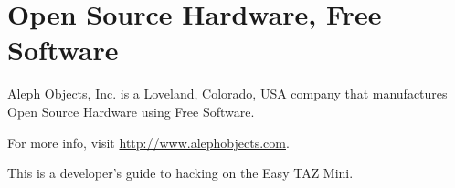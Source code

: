 %
%
%
%
%

\section{Open Source Hardware, Free Software}

Aleph Objects, Inc. is a Loveland, Colorado, USA company that manufactures
Open Source Hardware using Free Software.

For more info, visit \url{http://www.alephobjects.com}.

This is a developer's guide to hacking on the Easy TAZ Mini.

